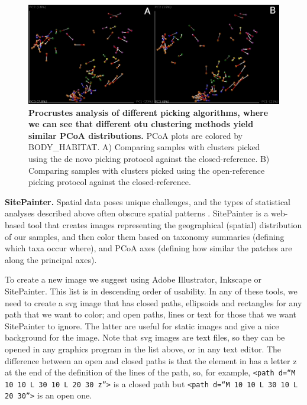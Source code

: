 \begin{figure}[htbp]
\includegraphics[width=\columnwidth]{chapter_book_figures/Figure_18.jpg}
\caption[Procrustes analysis of different picking algorithms, where we can see that different \gls{otu} clustering methods yield similar PCoA distributions]{\textbf{Procrustes analysis of different picking algorithms, where we can see that different \gls{otu} clustering methods yield similar PCoA distributions.}
PCoA plots are colored by BODY\_HABITAT. A) Comparing samples with clusters picked
using the de novo picking protocol against the closed-reference. B) Comparing
samples with clusters picked using the open-reference picking protocol against the closed-reference.}
\label{bfigure18}
\end{figure}

\textbf{SitePainter.} Spatial data poses unique challenges, and the types of statistical analyses
described above often obscure spatial patterns \cite{Gevers2012, Hewitt2013}.
SitePainter \cite{Gonzalez2012SitePainter} is a web-based tool that creates images representing the
geographical (spatial) distribution of our samples, and then color them based on taxonomy summaries
(defining which taxa occur where), and PCoA axes (defining how similar the patches are along the principal axes).

To create a new image we suggest using Adobe Illustrator, Inkscape or SitePainter. This list is in descending
order of usability. In any of these tools, we need to create a \gls{svg} image that has closed paths, ellipsoids
and rectangles for any path that we want to color; and open paths, lines or text for those that we want SitePainter
to ignore. The latter are useful for static images and give a nice background for the image. Note that \gls{svg}
images are text files, so they can be opened in any graphics program in the list above, or in any text editor.
The difference between an open and closed paths is that the element in has a letter z at the end of the definition
of the lines of the path, so, for example, \texttt{<path d=“M 10 10 L 30 10 L 20 30 z”>} is a closed path but
\texttt{<path d=“M 10 10 L 30 10 L 20 30”>} is an open one.

